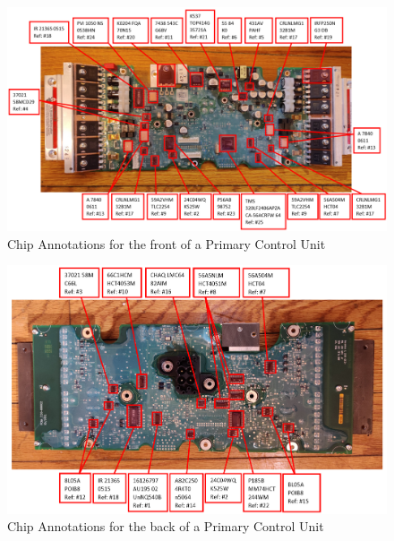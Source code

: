 \documentclass[]{formalLabReport}
\begin{document}
\begin{figure}
    \includegraphics[]{annotatedBoardFront.png}
    \caption{Chip Annotations for the front of a Primary Control Unit}
    \label{fig:annotatedBoardFront.png}
\end{figure}

\begin{figure}
    \includegraphics[]{annotatedBoardBack.png}
    \caption{Chip Annotations for the back of a Primary Control Unit}
    \label{fig:annotatedBoardBack.png}
\end{figure}
\end{document}
